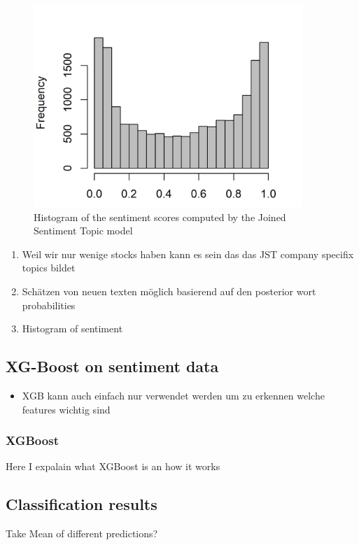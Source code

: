 \begin{figure}[h]
\centering
\includegraphics[width=4in]{figures/2SentimentsJST_Histogram.png}
\caption{Histogram of the sentiment scores computed by the Joined Sentiment Topic model}
\label{fig:JSTSentiment}
\end{figure}

\begin{enumerate}
    \item Weil wir nur wenige stocks haben kann es sein das das JST company specifix topics bildet
    \item Schätzen von neuen texten möglich basierend auf den posterior wort probabilities
    \item Histogram of sentiment
\end{enumerate}




\subsection{XG-Boost on sentiment data}
\begin{itemize}
    \item XGB kann auch einfach nur verwendet werden um zu erkennen welche features wichtig sind
\end{itemize}
\subsubsection{XGBoost}
Here I expalain what XGBoost is an how it works

\subsection{Classification results}
Take Mean of different predictions?


